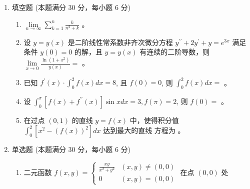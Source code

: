 

\begin{enumerate}
	\item
填空题 (本题满分 30 分，每小题 6 分)	
\begin{enumerate}
	\item
 $\lim\limits _{n \rightarrow \infty} \sum\limits_{k=1}^{n} \frac{k}{n^{2}+k}$  。


\item
设 $y=y(x)$ 是二阶线性常系数非齐次微分方程 $y^{\prime \prime}+2 y^{\prime}+y=e^{3 x}$ 满足条件 $y(0)=0$
的解，且 $y=y(x)$ 有连续的二阶导数，则 $\lim\limits _{x \rightarrow 0} \frac{\ln \left(1+x^{2}\right)}{y(x)}=$  。


\item
已知 $f^{\prime}(x) \cdot \int_{0}^{2} f(x) d x=8$, 且 $f(0)=0$, 则 $\int_{0}^{2} f(x) d x=$  。


\item
设 $\int_{0}^{\pi}\left[f(x)+f^{\prime \prime}(x)\right] \sin x d x=3, f(\pi)=2$, 则 $f(0)=$  。


\item
在过点 $(0,1)$ 的直线 $y=f(x)$ 中，使得积分值 $\int_{0}^{2}\left[x^{2}-(f(x))^{2}\right] d x$ 达到最大的直线 方程为  。
	
	
	
	
\end{enumerate}

\item 
单选题 (本题满分 30 分，每小题 6 分)
\begin{enumerate}
	\item
	二元函数 $f(x, y)=\left\{\begin{array}{ll}\frac{x y}{x^{2}+y^{2}} & (x, y) \neq(0,0) \\ 0 & (x, y)=(0,0)\end{array}\right.$ 在点 $(0,0)$ 处  
	

\end{enumerate}
\end{enumerate}
